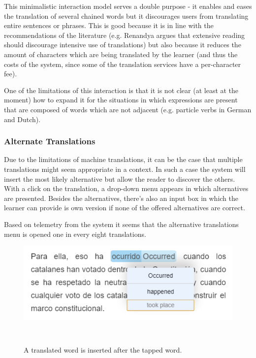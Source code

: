 This minimalistic interaction model serves a double purpose - it enables and eases the translation of several chained words but it discourages users from translating entire sentences or phrases. This is good because it is in line with the recommendations of the literature (e.g. Renandya argues that extensive reading should discourage intensive use of translations\cite{renadya07-power}) but also because it reduces the amount of characters which are being translated by the learner (and thus the costs of the system, since some of the translation services have a per-character fee). 

One of the limitations of this interaction is that it is not clear (at least at the moment) how to expand it for the situations in which expressions are present that are composed of words which are not adjacent (e.g. particle verbs in German and Dutch).


\subsubsection{Alternate Translations}
Due to the limitations of machine translations, it can be the case that multiple translations might seem appropriate in a context. In such a case the system will insert the most likely alternative but allow the reader to discover the others. With a click on the translation, a drop-down menu appears in which alternatives are presented. Besides the alternatives, there's also an input box in which the learner can provide is own version if none of the offered alternatives are correct. 

Based on telemetry from the system it seems that  the alternative translations menu is opened one in every eight translations. 

\begin{figure}[h!]
\centering
  \includegraphics[width=0.8\columnwidth]{figures/translation_alter_menu}
  \caption{A translated word is inserted after the tapped word.}~\label{fig:registrations}
\end{figure}

